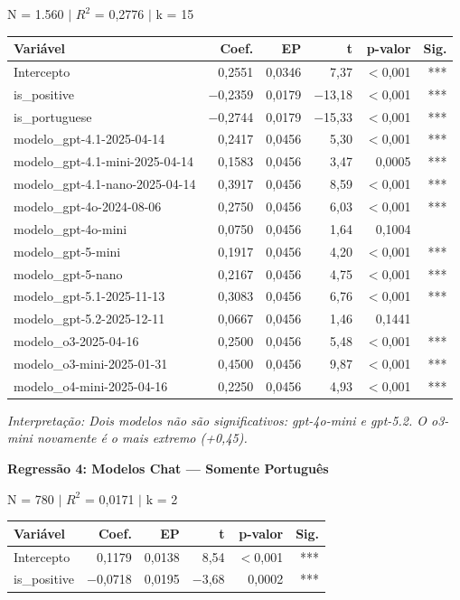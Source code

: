 \documentclass[12pt,a4paper]{article}
\begin{document}
\noindent N = 1.560 $|$ $R^2$ = 0,2776 $|$ k = 15

\begin{table}[H]
\centering
\small
\begin{tabular}{lrrrrr}
\toprule
\textbf{Variável} & \textbf{Coef.} & \textbf{EP} & \textbf{t} & \textbf{p-valor} & \textbf{Sig.} \\
\midrule
Intercepto & 0,2551 & 0,0346 & 7,37 & $<$0,001 & *** \\
is\_positive & $-$0,2359 & 0,0179 & $-$13,18 & $<$0,001 & *** \\
is\_portuguese & $-$0,2744 & 0,0179 & $-$15,33 & $<$0,001 & *** \\
modelo\_gpt-4.1-2025-04-14 & 0,2417 & 0,0456 & 5,30 & $<$0,001 & *** \\
modelo\_gpt-4.1-mini-2025-04-14 & 0,1583 & 0,0456 & 3,47 & 0,0005 & *** \\
modelo\_gpt-4.1-nano-2025-04-14 & 0,3917 & 0,0456 & 8,59 & $<$0,001 & *** \\
modelo\_gpt-4o-2024-08-06 & 0,2750 & 0,0456 & 6,03 & $<$0,001 & *** \\
modelo\_gpt-4o-mini & 0,0750 & 0,0456 & 1,64 & 0,1004 & \\
modelo\_gpt-5-mini & 0,1917 & 0,0456 & 4,20 & $<$0,001 & *** \\
modelo\_gpt-5-nano & 0,2167 & 0,0456 & 4,75 & $<$0,001 & *** \\
modelo\_gpt-5.1-2025-11-13 & 0,3083 & 0,0456 & 6,76 & $<$0,001 & *** \\
modelo\_gpt-5.2-2025-12-11 & 0,0667 & 0,0456 & 1,46 & 0,1441 & \\
modelo\_o3-2025-04-16 & 0,2500 & 0,0456 & 5,48 & $<$0,001 & *** \\
modelo\_o3-mini-2025-01-31 & 0,4500 & 0,0456 & 9,87 & $<$0,001 & *** \\
modelo\_o4-mini-2025-04-16 & 0,2250 & 0,0456 & 4,93 & $<$0,001 & *** \\
\bottomrule
\end{tabular}
\end{table}

\noindent\textit{Interpretação: Dois modelos não são significativos: gpt-4o-mini e
gpt-5.2. O o3-mini novamente é o mais extremo (+0,45).}

\vspace{0.5cm}
\noindent\textbf{Regressão 4: Modelos Chat --- Somente Português}

\noindent N = 780 $|$ $R^2$ = 0,0171 $|$ k = 2

\begin{table}[H]
\centering
\begin{tabular}{lrrrrr}
\toprule
\textbf{Variável} & \textbf{Coef.} & \textbf{EP} & \textbf{t} & \textbf{p-valor} & \textbf{Sig.} \\
\midrule
Intercepto & 0,1179 & 0,0138 & 8,54 & $<$0,001 & *** \\
is\_positive & $-$0,0718 & 0,0195 & $-$3,68 & 0,0002 & *** \\
\bottomrule
\end{tabular}
\end{table}
\end{document}
